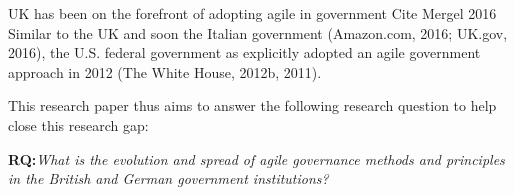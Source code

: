 
UK has been on the forefront of adopting agile in government 
Cite Mergel 2016
Similar to the UK and soon the Italian government (Amazon.com, 2016; UK.gov, 2016), the U.S. federal government as explicitly adopted an agile government approach in 2012 (The White House, 2012b, 2011). 







This research paper thus aims to answer the following research question to help close this research gap: 
\begin{addmargin}[2em]{2em}%
\textbf{RQ:}\textit{What is the evolution and spread of agile governance methods and principles in the British and German government institutions?}\label{RQ1}
\end{addmargin}\par 